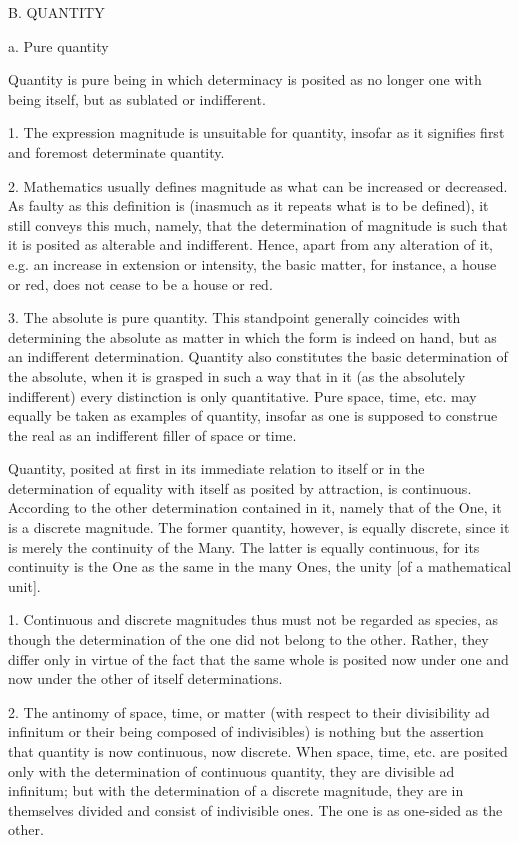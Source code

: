 B. QUANTITY

a. Pure quantity

Quantity is pure being in which determinacy is posited as
no longer one with being itself, but as sublated or indifferent.

    1. The expression magnitude is unsuitable for quantity,
    insofar as it signifies first and foremost determinate quantity.

    2. Mathematics usually defines magnitude
    as what can be increased or decreased.
    As faulty as this definition is
    (inasmuch as it repeats what is to be defined),
    it still conveys this much, namely,
    that the determination of magnitude is such that
    it is posited as alterable and indifferent.
    Hence, apart from any alteration of it,
    e.g. an increase in extension or intensity,
    the basic matter, for instance, a house or red,
    does not cease to be a house or red.

    3. The absolute is pure quantity.
    This standpoint generally coincides
    with determining the absolute as matter
    in which the form is indeed on hand,
    but as an indifferent determination.
    Quantity also constitutes the basic
    determination of the absolute,
    when it is grasped in such a way
    that in it (as the absolutely indifferent)
    every distinction is only quantitative.
    Pure space, time, etc. may equally
    be taken as examples of quantity,
    insofar as one is supposed to construe
    the real as an indifferent filler of space or time.

Quantity, posited at first in
its immediate relation to itself
or in the determination of equality with itself
as posited by attraction, is continuous.
According to the other determination contained in it,
namely that of the One, it is a discrete magnitude.
The former quantity, however, is equally discrete,
since it is merely the continuity of the Many.
The latter is equally continuous,
for its continuity is the One
as the same in the many Ones,
the unity [of a mathematical unit].

    1. Continuous and discrete magnitudes
    thus must not be regarded as species,
    as though the determination of the one
    did not belong to the other.
    Rather, they differ only in virtue of
    the fact that the same whole is posited
    now under one and now under the other
    of itself determinations.

    2. The antinomy of space, time, or matter
    (with respect to their divisibility ad infinitum
    or their being composed of indivisibles)
    is nothing but the assertion that quantity is
    now continuous, now discrete.
    When space, time, etc. are posited only with
    the determination of continuous quantity,
    they are divisible ad infinitum;
    but with the determination of a discrete magnitude,
    they are in themselves divided
    and consist of indivisible ones.
    The one is as one-sided as the other.

